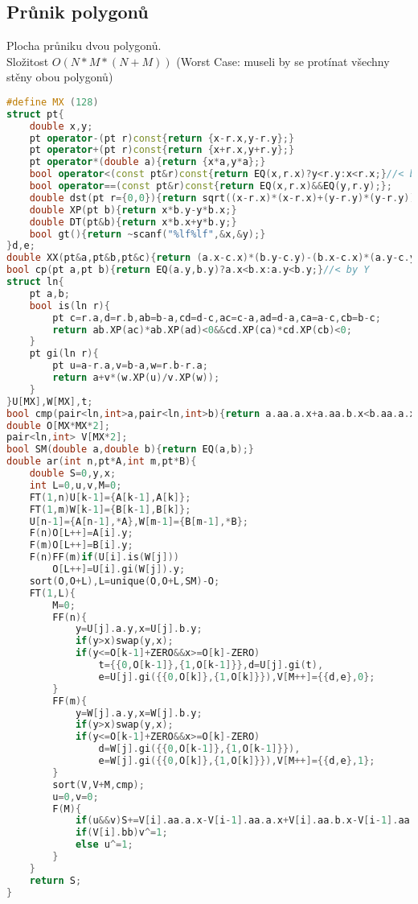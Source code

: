 \documentclass[11pt]{article}
\begin{document}
\subsection{Průnik polygonů}
Plocha průniku dvou polygonů.
\\Složitost $O(N*M*(N+M))$ (Worst Case: museli by se protínat všechny stěny obou polygonů)
\begin{lstlisting}[language=C++]
#define MX (128)
struct pt{
    double x,y;
    pt operator-(pt r)const{return {x-r.x,y-r.y};}
    pt operator+(pt r)const{return {x+r.x,y+r.y};}
    pt operator*(double a){return {x*a,y*a};}
    bool operator<(const pt&r)const{return EQ(x,r.x)?y<r.y:x<r.x;}//< by X
    bool operator==(const pt&r)const{return EQ(x,r.x)&&EQ(y,r.y);};
    double dst(pt r={0,0}){return sqrt((x-r.x)*(x-r.x)+(y-r.y)*(y-r.y));}
    double XP(pt b){return x*b.y-y*b.x;}
    double DT(pt&b){return x*b.x+y*b.y;}
    bool gt(){return ~scanf("%lf%lf",&x,&y);}
}d,e;
double XX(pt&a,pt&b,pt&c){return (a.x-c.x)*(b.y-c.y)-(b.x-c.x)*(a.y-c.y);}
bool cp(pt a,pt b){return EQ(a.y,b.y)?a.x<b.x:a.y<b.y;}//< by Y
struct ln{
    pt a,b;
    bool is(ln r){
        pt c=r.a,d=r.b,ab=b-a,cd=d-c,ac=c-a,ad=d-a,ca=a-c,cb=b-c;
        return ab.XP(ac)*ab.XP(ad)<0&&cd.XP(ca)*cd.XP(cb)<0;
    }
    pt gi(ln r){
        pt u=a-r.a,v=b-a,w=r.b-r.a;
        return a+v*(w.XP(u)/v.XP(w));
    }
}U[MX],W[MX],t;
bool cmp(pair<ln,int>a,pair<ln,int>b){return a.aa.a.x+a.aa.b.x<b.aa.a.x+b.aa.b.x;}
double O[MX*MX*2];
pair<ln,int> V[MX*2];
bool SM(double a,double b){return EQ(a,b);}
double ar(int n,pt*A,int m,pt*B){
    double S=0,y,x;
    int L=0,u,v,M=0;
    FT(1,n)U[k-1]={A[k-1],A[k]};
    FT(1,m)W[k-1]={B[k-1],B[k]};
    U[n-1]={A[n-1],*A},W[m-1]={B[m-1],*B};
    F(n)O[L++]=A[i].y;
    F(m)O[L++]=B[i].y;
    F(n)FF(m)if(U[i].is(W[j]))
        O[L++]=U[i].gi(W[j]).y;
    sort(O,O+L),L=unique(O,O+L,SM)-O;
    FT(1,L){
        M=0;
        FF(n){
            y=U[j].a.y,x=U[j].b.y;
            if(y>x)swap(y,x);
            if(y<=O[k-1]+ZERO&&x>=O[k]-ZERO)
                t={{0,O[k-1]},{1,O[k-1]}},d=U[j].gi(t),
                e=U[j].gi({{0,O[k]},{1,O[k]}}),V[M++]={{d,e},0};
        }
        FF(m){
            y=W[j].a.y,x=W[j].b.y;
            if(y>x)swap(y,x);
            if(y<=O[k-1]+ZERO&&x>=O[k]-ZERO)
                d=W[j].gi({{0,O[k-1]},{1,O[k-1]}}),
                e=W[j].gi({{0,O[k]},{1,O[k]}}),V[M++]={{d,e},1};
        }
        sort(V,V+M,cmp);
        u=0,v=0;
        F(M){
            if(u&&v)S+=V[i].aa.a.x-V[i-1].aa.a.x+V[i].aa.b.x-V[i-1].aa.b.x;
            if(V[i].bb)v^=1;
            else u^=1;
        }
    }
    return S;
}
\end{lstlisting}
\end{document}
